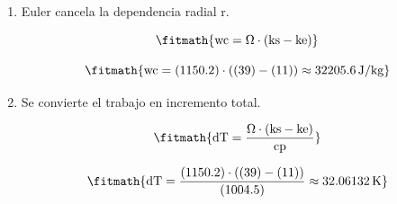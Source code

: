 \begin{enumerate}

\item Euler cancela la dependencia radial r.

\[\fitmath{\mathrm{wc}=\Omega\cdot \left(\mathrm{ks}-\mathrm{ke}\right)}\]

\[\fitmath{\mathrm{wc}=(1150.2)\cdot \left((39)-(11)\right)\approx 32205.6\,\mathrm{J/kg}}\]

\item Se convierte el trabajo en incremento total.

\[\fitmath{\mathrm{dT}=\frac{\Omega\cdot \left(\mathrm{ks}-\mathrm{ke}\right)}{\mathrm{cp}}}\]

\[\fitmath{\mathrm{dT}=\frac{(1150.2)\cdot \left((39)-(11)\right)}{(1004.5)}\approx 32.06132\,\mathrm{K}}\]

\end{enumerate}
